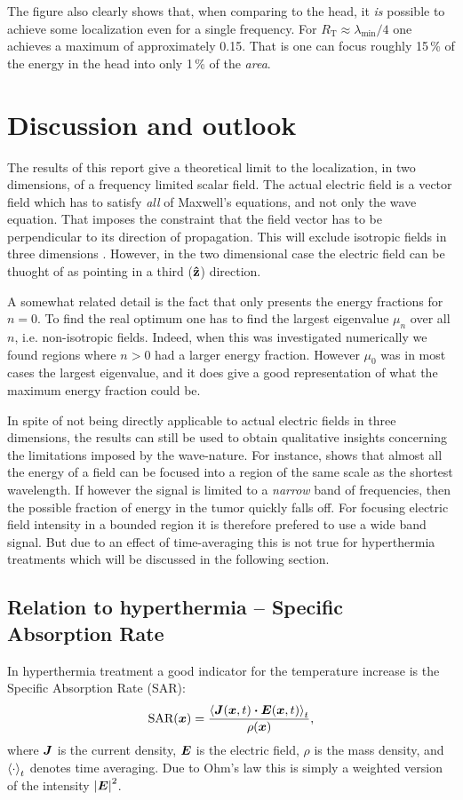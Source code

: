 \documentclass[11pt,a4paper, 
swedish,english %
]{article}
\newcommand{\RT}{\ensuremath{R_{\text{T}}}}
\begin{document}
The figure also clearly shows that, when comparing to the head, it
\emph{is} possible to achieve some localization even for a single
frequency. For $\RT \approx \lambda_{\min}/4$ one achieves a maximum
of approximately 0.15. That is one can focus roughly 15\,\% of the
energy in the head into only 1\,\% of the \emph{area}. 



\section{Discussion and outlook}
The results of this report give a theoretical limit to the
localization, in two dimensions, of a frequency limited scalar field.
The actual electric field is a vector field which has to satisfy
\emph{all} of Maxwell's equations, and not only the wave
equation. That imposes the constraint that the field vector has to be
perpendicular to its direction of propagation. This will exclude
isotropic fields in three dimensions \cite{Jackson}.
However, in the two dimensional case the electric field can be thuoght
of as pointing in a third ($\vu{z}$) direction.

A somewhat related detail is the fact that  only
presents the energy fractions for $n=0$. To find the
real optimum one has to find the largest eigenvalue $\mu_n$ over all
$n$, i.e. non-isotropic fields. Indeed, when this was investigated
numerically we found regions where $n>0$ had a larger energy
fraction. However $\mu_0$ was in most cases the largest eigenvalue,
and it does give a good representation of what the maximum 
energy fraction could be. 


In spite of not being directly applicable to actual electric fields in
three dimensions,
the results can still be used to obtain 
qualitative insights concerning the limitations imposed by the
wave-nature. For instance,  shows that almost all the
energy of a field can be focused into a region of the same scale as
the shortest wavelength. If however the signal is limited to a
\emph{narrow} band of frequencies, then the possible fraction of
energy in the tumor quickly falls off. 
For focusing electric field intensity in
a bounded region it is therefore prefered to use a wide band
signal. But due to an effect of time-averaging this is not true for
hyperthermia treatments which will be discussed in the following
section. 

\subsection{Relation to hyperthermia -- Specific Absorption Rate}
\label{sec:SAR}
In hyperthermia treatment a good indicator for the temperature
increase is the Specific Absorption Rate (SAR): 
\begin{equation}
\text{SAR}(\vb*x)=
\frac{\ev{\vb*J(\vb*x,t)\vdot \vb*E(\vb*x,t)}_t}{\rho(\vb*x)},
\end{equation}
where $\vb*J$ is the current density, $\vb*E$ is the
electric field, $\rho$ is the mass density, and $\ev{\cdot}_t$ denotes
time averaging. 
Due to Ohm's law this is simply a weighted version of the intensity
$\abs{\vb*E}^2$.
\end{document}
